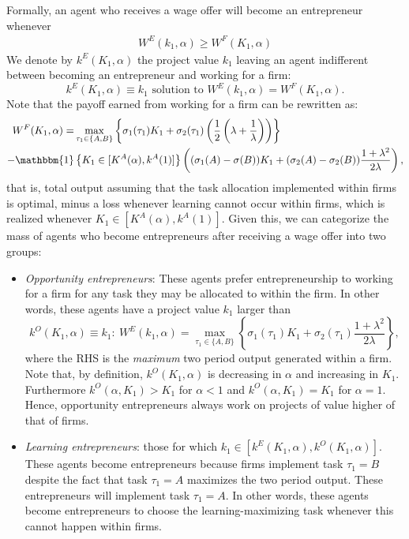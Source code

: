 \documentclass[12pt,american]{paper}
\theoremstyle{remark}
\begin{document}
Formally, an agent who receives a wage offer will become an entrepreneur whenever 
  \begin{align*}
 W^E(k_1,\alpha) \geq  W^F (K_1, \alpha)
 \end{align*}
We denote by $k^E (K_1,\alpha)$ the project value $k_1$ leaving an agent indifferent between becoming an entrepreneur and working for a firm:
\[
k^E (K_1,\alpha)\equiv k_1 \text{ solution to } W^E(k_1,\alpha) = W^F (K_1, \alpha) .
\]
Note that the payoff earned from working for a firm can be rewritten as:
 \begin{align*}
 W^F (K_1, \alpha) =  &\max_{\tau_1\in\{A,B\}} \left\lbrace  \sigma_1(\tau_1) K_1+  \sigma_2(\tau_1)  \left(  \frac{1}{2} \left( \lambda + \frac{1}{\lambda} \right)\right) \right\rbrace \\ - \mathbbm{1}&\left\lbrace K_1 \in [K^A(\alpha), k^A(1)] \right\rbrace \left( ( \sigma_1(A) - \sigma(B)) K_1+  (\sigma_2(A) - \sigma_2(B))    \frac{1+\lambda^2}{2\lambda}\right),
\end{align*}
that is, total output assuming that the task allocation implemented within firms is optimal, minus a loss whenever learning cannot occur within firms, which is realized whenever $K_1 \in [K^A(\alpha), k^A(1)] $.  Given this, we can categorize the mass of agents who become entrepreneurs after receiving a wage offer into two groups:
\begin{itemize}
\item \emph{Opportunity entrepreneurs}: These agents prefer entrepreneurship to working for a firm for any task they may be allocated to within the firm. In other words, these agents have a project value $k_1$ larger than  
\[
k^O (K_1,\alpha)\equiv k_1: ~  W^E(k_1,\alpha) = \max_{\tau_1\in\{A,B\}} \left\lbrace  \sigma_1(\tau_1) K_1+  \sigma_2(\tau_1) \frac{1+\lambda^2}{2\lambda} \right\rbrace,
\]
where the RHS is the \emph{maximum} two period output generated within a firm. Note that, by definition, $k^O( K_1, \alpha)$ is decreasing in $\alpha$ and increasing in $K_1$. Furthermore $k^O(\alpha, K_1) > K_1$ for  $\alpha<1$ and $k^O(\alpha, K_1) = K_1$ for $\alpha=1$. Hence, opportunity entrepreneurs always work on projects of value higher of that of firms.
\item \emph{Learning entrepreneurs}: those for which $k_1 \in [k^E (K_1,\alpha), k^O (K_1,\alpha)]$. These agents become entrepreneurs because firms implement task $\tau_1=B$ despite the fact that task $\tau_1=A$ maximizes the two period output. These entrepreneurs will implement task $\tau_1=A$. In other words, these agents become entrepreneurs to choose the learning-maximizing task whenever this cannot happen within firms. 
\end{itemize}
\end{document}

